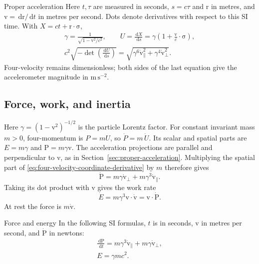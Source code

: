 \documentclass[11pt]{article}
\newcommand{\pv}[1]{{#1}}
\newcommand{\vstyle}[1]{{\bm{\mathrm{#1}}}}
\newcommand{\pP}{\pv{P}}
\newcommand{\pU}{\pv{U}}
\newcommand{\pX}{\pv{X}}
\numberwithin{equation}{section}
\newcommand{\dotprod}{\cdot}
\newcommand{\bsig}{\vstyle{\sigma}}
\newcommand{\br}{\vstyle{r}}
\newcommand{\bv}{\vstyle{v}}
\newcommand{\bp}{\vstyle{P}}
\newcommand{\dd}{\,\mathrm d}
\begin{document}
\begin{SIunits}{Proper acceleration}
Here $t,\tau$ are measured in seconds, $s=c\tau$ and $\br$ in metres,
and $\bv=\dd\br/\dd t$ in metres per second. Dots denote derivatives
with respect to this SI time. With $\pX=ct+\br\dotprod\bsig$,
\begin{gather*}
 \gamma=\frac1{\sqrt{1-\bv^2/c^2}},\qquad
 \pU=\frac{\dd\pX}{\dd s}
 =\gamma\left(1+\frac{\bv}{c}\dotprod\bsig\right),\\
 c^2\sqrt{-\det\left(\frac{\dd\pU}{\dd s}\right)}
 =\sqrt{\gamma^6\dot{\bv}_{\parallel}^2
       +\gamma^4\dot{\bv}_{\perp}^2}.
\end{gather*}
Four-velocity remains dimensionless; both sides of the last equation give
the accelerometer magnitude in $\mathrm{m\,s^{-2}}$.
\end{SIunits}

\subsection{Force, work, and inertia}
\label{sec:energy-inertia}
Here $\gamma=(1-\bv^2)^{-1/2}$ is the particle Lorentz factor.
For constant invariant mass $m>0$, four-momentum is $\pP=m\pU$,
so $\dot{\pP}=m\,\dot{\pU}$. Its scalar and spatial parts are
$E=m\gamma$ and $\bp=m\gamma\bv$.
The acceleration projections are parallel and perpendicular to $\bv$,
as in Section~\ref{sec:proper-acceleration}.
Multiplying the spatial part of
\eqref{eq:four-velocity-coordinate-derivative} by $m$ therefore gives
\begin{equation}
 \dot{\bp}=m\gamma\dot{\bv}_{\perp}+m\gamma^3\dot{\bv}_{\parallel}.
 \label{eq:relativistic-inertia}
\end{equation}
Taking its dot product with $\bv$ gives the work rate
\begin{equation}
 \dot{E}=m\gamma^3\bv\dotprod\dot{\bv}
 =\bv\dotprod\dot{\bp}.
 \label{eq:relativistic-work}
\end{equation}
At rest the force is $m\dot{\bv}$.

\begin{SIunits}{Force and energy}
In the following SI formulas,
$t$ is in seconds, $\bv$ in metres per second, and $\dot{\bp}$ in newtons:
\begin{gather*}
 \frac{\dd\bp}{\dd t}
 =m\gamma^3\dot{\bv}_{\parallel}
 +m\gamma\dot{\bv}_{\perp},\\
 E=\gamma mc^2.
\end{gather*}
\end{SIunits}
\end{document}
